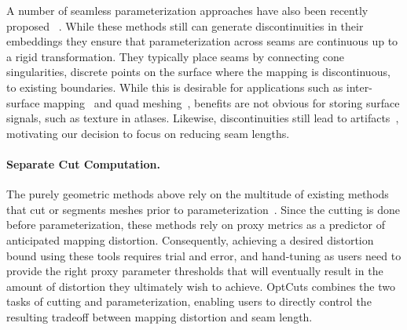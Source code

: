 A number of seamless parameterization approaches have also been recently proposed ~\cite{Kharevych,Myles}. While these methods still can generate discontinuities in their embeddings they ensure that parameterization across seams are continuous up to a rigid transformation. They typically place seams by connecting cone singularities, discrete points on the surface where the mapping is discontinuous, to existing boundaries. While this is desirable for applications such as inter-surface mapping~\cite{Aigerman} and quad meshing~\cite{Ray}, benefits are not obvious for storing surface signals, such as texture in atlases. Likewise, discontinuities still lead to artifacts~\cite{LiuFerguson}, motivating our decision to focus on reducing seam lengths. %


\paragraph{Separate Cut Computation.}
The purely geometric methods above rely on the multitude of existing methods that cut or segments meshes prior to parameterization~\cite{Sheffer2002Seamster,Julius2005D,Snyder2003Multi,Levy2002}.
Since the cutting is done before parameterization, these methods rely on proxy metrics as a predictor of anticipated mapping distortion. Consequently, achieving a desired distortion bound using these tools requires trial and error, and hand-tuning as users need to provide the right proxy parameter thresholds that will eventually result in the amount of distortion they ultimately wish to achieve. OptCuts combines the two tasks of cutting and parameterization, enabling users to directly control the resulting tradeoff between mapping distortion and seam length. 


